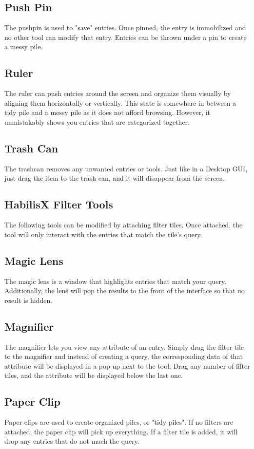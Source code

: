 \documentclass{article}
\begin{document}
\subsection*{Push Pin}
The pushpin is used to "save" entries.  Once pinned, the entry is immobilized and no other tool can modify that entry.  Entries can be thrown under a pin to create a messy pile.  
\subsection*{Ruler}
The ruler can push entries around the screen and organize them visually by aligning them horizontally or vertically.  This state is somewhere in between a tidy pile and a messy pile as it does not afford browsing.  However, it unmistakably shows you entries that are categorized together.  
\subsection*{Trash Can}
The trashcan removes any unwanted entries or tools.  Just like in a Desktop GUI, just drag the item to the trash can, and it will disappear from the screen.  
\subsection{HabilisX Filter Tools}
The following tools can be modified by attaching filter tiles.  Once attached, the tool will only interact with the entries that match the tile's query.  
\subsection*{Magic Lens}
The magic lens is a window that highlights entries that match your query.  Additionally, the lens will pop the results to the front of the interface so that no result is hidden.  
\subsection*{Magnifier}
The magnifier lets you view any attribute of an entry.  Simply drag the filter tile to the magnifier and instead of creating a query, the corresponding data of that attribute will be displayed in a pop-up next to the tool.  Drag any number of filter tiles, and the attribute will be displayed below the last one.  
\subsection*{Paper Clip}
Paper clips are used to create organized piles, or "tidy piles".  If no filters are attached, the paper clip will pick up everything.  If a filter tile is added, it will drop any entries that do not mach the query. 
\end{document}
